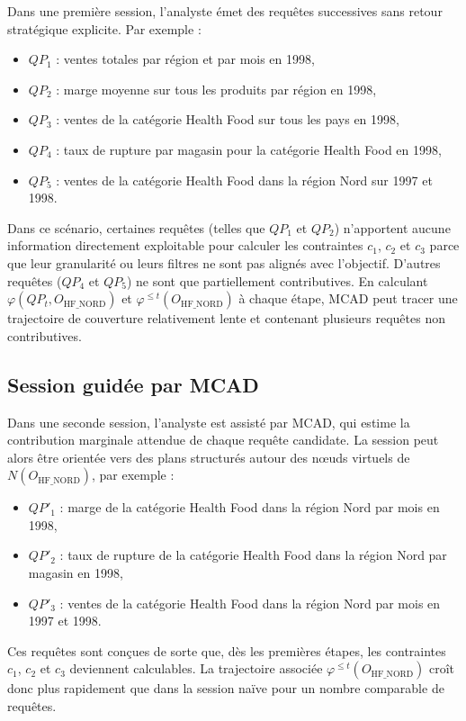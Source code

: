 \documentclass[journal]{IEEEtran}
\begin{document}
Dans une première session, l'analyste émet des requêtes successives sans retour stratégique explicite. Par exemple :
\begin{itemize}
  \item $QP_1$ : ventes totales par région et par mois en 1998,
  \item $QP_2$ : marge moyenne sur tous les produits par région en 1998,
  \item $QP_3$ : ventes de la catégorie Health Food sur tous les pays en 1998,
  \item $QP_4$ : taux de rupture par magasin pour la catégorie Health Food en 1998,
  \item $QP_5$ : ventes de la catégorie Health Food dans la région Nord sur 1997 et 1998.
\end{itemize}
Dans ce scénario, certaines requêtes (telles que $QP_1$ et $QP_2$) n'apportent aucune information directement exploitable pour calculer les contraintes $c_1$, $c_2$ et $c_3$ parce que leur granularité ou leurs filtres ne sont pas alignés avec l'objectif. D'autres requêtes ($QP_4$ et $QP_5$) ne sont que partiellement contributives. En calculant $\varphi(QP_t,O_{\mathrm{HF\_NORD}})$ et $\varphi^{\le t}(O_{\mathrm{HF\_NORD}})$ à chaque étape, MCAD peut tracer une trajectoire de couverture relativement lente et contenant plusieurs requêtes non contributives.

\subsection{Session guidée par MCAD}

Dans une seconde session, l'analyste est assisté par MCAD, qui estime la contribution marginale attendue de chaque requête candidate. La session peut alors être orientée vers des plans structurés autour des nœuds virtuels de $N(O_{\mathrm{HF\_NORD}})$, par exemple :
\begin{itemize}
  \item $QP'_1$ : marge de la catégorie Health Food dans la région Nord par mois en 1998,
  \item $QP'_2$ : taux de rupture de la catégorie Health Food dans la région Nord par magasin en 1998,
  \item $QP'_3$ : ventes de la catégorie Health Food dans la région Nord par mois en 1997 et 1998.
\end{itemize}
Ces requêtes sont conçues de sorte que, dès les premières étapes, les contraintes $c_1$, $c_2$ et $c_3$ deviennent calculables. La trajectoire associée $\varphi^{\le t}(O_{\mathrm{HF\_NORD}})$ croît donc plus rapidement que dans la session naïve pour un nombre comparable de requêtes.
\end{document}
